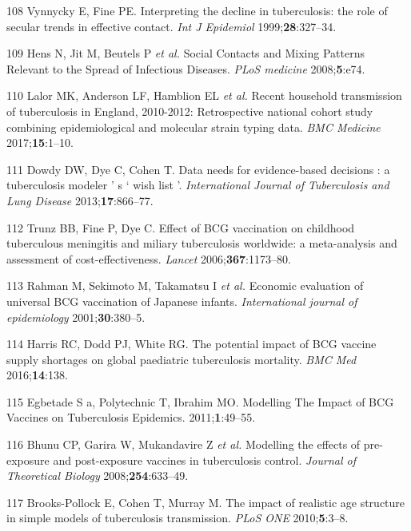 \documentclass[11pt,twoside]{bristolthesis}
\begin{document}
  \leavevmode\hypertarget{ref-Vynnycky1999}{}%
  108 Vynnycky E, Fine PE. Interpreting the decline in tuberculosis: the role of secular trends in effective contact. \emph{Int J Epidemiol} 1999;\textbf{28}:327--34.
  
  \leavevmode\hypertarget{ref-Mossong2008}{}%
  109 Hens N, Jit M, Beutels P \emph{et al.} Social Contacts and Mixing Patterns Relevant to the Spread of Infectious Diseases. \emph{PLoS medicine} 2008;\textbf{5}:e74.
  
  \leavevmode\hypertarget{ref-Lalor2017}{}%
  110 Lalor MK, Anderson LF, Hamblion EL \emph{et al.} Recent household transmission of tuberculosis in England, 2010-2012: Retrospective national cohort study combining epidemiological and molecular strain typing data. \emph{BMC Medicine} 2017;\textbf{15}:1--10.
  
  \leavevmode\hypertarget{ref-Dowdy2012}{}%
  111 Dowdy DW, Dye C, Cohen T. Data needs for evidence-based decisions : a tuberculosis modeler ' s ` wish list '. \emph{International Journal of Tuberculosis and Lung Disease} 2013;\textbf{17}:866--77.
  
  \leavevmode\hypertarget{ref-Trunz2006}{}%
  112 Trunz BB, Fine P, Dye C. Effect of BCG vaccination on childhood tuberculous meningitis and miliary tuberculosis worldwide: a meta-analysis and assessment of cost-effectiveness. \emph{Lancet} 2006;\textbf{367}:1173--80.
  
  \leavevmode\hypertarget{ref-Rahman2001a}{}%
  113 Rahman M, Sekimoto M, Takamatsu I \emph{et al.} Economic evaluation of universal BCG vaccination of Japanese infants. \emph{International journal of epidemiology} 2001;\textbf{30}:380--5.
  
  \leavevmode\hypertarget{ref-Harris2016}{}%
  114 Harris RC, Dodd PJ, White RG. The potential impact of BCG vaccine supply shortages on global paediatric tuberculosis mortality. \emph{BMC Med} 2016;\textbf{14}:138.
  
  \leavevmode\hypertarget{ref-Egbetade2011a}{}%
  115 Egbetade S a, Polytechnic T, Ibrahim MO. Modelling The Impact of BCG Vaccines on Tuberculosis Epidemics. 2011;\textbf{1}:49--55.
  
  \leavevmode\hypertarget{ref-Bhunu2008b}{}%
  116 Bhunu CP, Garira W, Mukandavire Z \emph{et al.} Modelling the effects of pre-exposure and post-exposure vaccines in tuberculosis control. \emph{Journal of Theoretical Biology} 2008;\textbf{254}:633--49.
  
  \leavevmode\hypertarget{ref-Brooks-Pollock2010}{}%
  117 Brooks-Pollock E, Cohen T, Murray M. The impact of realistic age structure in simple models of tuberculosis transmission. \emph{PLoS ONE} 2010;\textbf{5}:3--8.
  
\end{document}
